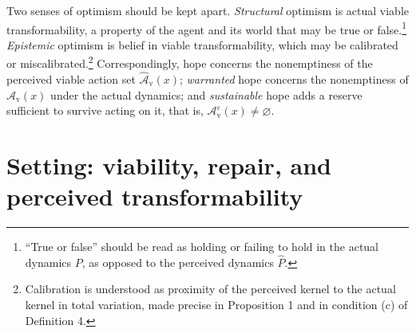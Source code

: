 \documentclass[11pt]{article}
\theoremstyle{remark}
\begin{document}
Two senses of optimism should be kept apart. \emph{Structural} optimism is actual viable transformability, a property of the agent and its world that may be true or false.\footnote{``True or false'' should be read as holding or failing to hold in the actual dynamics $P$, as opposed to the perceived dynamics $\hat P$.} \emph{Epistemic} optimism is belief in viable transformability, which may be calibrated or miscalibrated.\footnote{Calibration is understood as proximity of the perceived kernel to the actual kernel in total variation, made precise in Proposition 1 and in condition (c) of Definition 4.} Correspondingly, hope concerns the nonemptiness of the perceived viable action set $\hat{\mathcal A}_{\mathrm v}(x)$; \emph{warranted} hope concerns the nonemptiness of $\mathcal A_{\mathrm v}(x)$ under the actual dynamics; and \emph{sustainable} hope adds a reserve sufficient to survive acting on it, that is, $\mathcal A^\varepsilon_{\mathrm v}(x)\neq\varnothing$.

\section{Setting: viability, repair, and perceived transformability}
\end{document}

